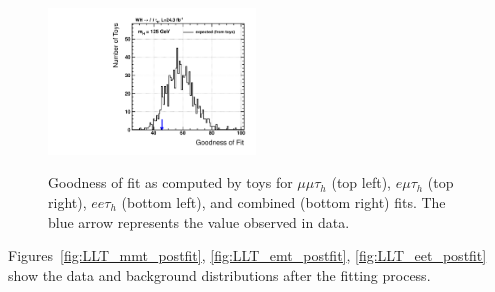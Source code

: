 \begin{figure}
\begin{center}
  \includegraphics[width=0.49\textwidth]{4_Analisys/pics/GoF/vhtt_wh-goodness-of-fit-125.pdf}\\
  \caption{Goodness of fit as computed by toys for $\mu\mu\tau_h$ (top left), $e\mu\tau_h$ (top right), $ee\tau_h$ (bottom left), and combined (bottom right) fits. The blue arrow represents the value observed in data.}
  \label{fig:gof}
\end{center}
\end{figure}


Figures~\ref{fig:LLT_mmt_postfit}, \ref{fig:LLT_emt_postfit}, \ref{fig:LLT_eet_postfit} show the data and background distributions after the fitting process.

